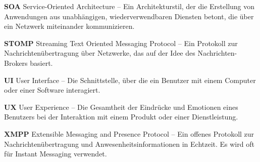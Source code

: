 \textbf{SOA} Service-Oriented Architecture -- Ein Architekturstil, der die Erstellung von Anwendungen aus unabhängigen, wiederverwendbaren Diensten betont, die über ein Netzwerk miteinander kommunizieren.

\vspace{5mm}

\textbf{STOMP} Streaming Text Oriented Messaging Protocol -- Ein Protokoll zur Nachrichtenübertragung über Netzwerke, das auf der Idee des Nachrichten-Brokers basiert.

\vspace{5mm}

\textbf{UI} User Interface -- Die Schnittstelle, über die ein Benutzer mit einem Computer oder einer Software interagiert.

\vspace{5mm}

\textbf{UX} User Experience -- Die Gesamtheit der Eindrücke und Emotionen eines Benutzers bei der Interaktion mit einem Produkt oder einer Dienstleistung.

\vspace{5mm}

\textbf{XMPP} Extensible Messaging and Presence Protocol -- Ein offenes Protokoll zur Nachrichtenübertragung und Anwesenheitsinformationen in Echtzeit. Es wird oft für Instant Messaging verwendet.
